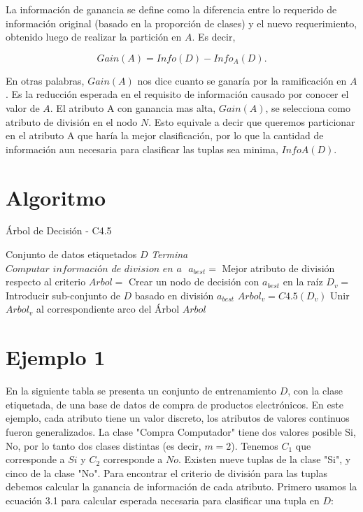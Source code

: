 La información de ganancia se define como la diferencia entre lo requerido de información original (basado en la proporción de clases) y el nuevo requerimiento, obtenido luego de realizar la partición en $A$. Es decir,

\begin{equation}
Gain(A) = Info(D) - Info_{A}(D).
\end{equation}

En otras palabras, $Gain(A)$ nos dice cuanto se ganaría por la ramificación en $A$. Es la reducción esperada en el requisito de información causado por conocer el valor de $A$. El atributo A con ganancia mas alta, $Gain(A)$, se selecciona como atributo de división en el nodo $N$. Esto equivale a decir que queremos particionar en el atributo A que haría la mejor clasificación, por lo que la cantidad de información aun necesaria para clasificar las tuplas sea minima, $InfoA(D)$.


\section{Algoritmo}

\begin{algorithm}
	\caption{Árbol de Decisión - C4.5}
	\label{algoC45}
	\begin{algorithmic}[1]
		\Require Conjunto de datos etiquetados $D$
				\State\textit{Termina}
			\EndIf
				\State $\textit{Computar información de division en a }$
			\EndFor
			\State $ a_{best} =$ Mejor atributo de división respecto al criterio 
			\State $ Arbol =$ Crear un nodo de decisión con $ a_{best} $ en la raíz 
			\State $ D_{v} =$ Introducir sub-conjunto de $D$ basado en división $ a_{best} $
				\State $ Arbol_{v} = C4.5(D_{v}) $
				\State Unir $ Arbol_{v} $ al correspondiente arco del Árbol
			\EndFor
			\State 
			\Return $ Arbol $
		\EndProcedure
	\end{algorithmic}
\end{algorithm}

\section{Ejemplo 1}

En la siguiente tabla se presenta un conjunto de entrenamiento $D$, con la clase etiquetada, de una base de datos de compra de productos electrónicos. En este ejemplo, cada atributo tiene un valor discreto, los atributos de valores continuos fueron generalizados. La clase "Compra Computador" tiene dos valores posible {Si, No}, por lo tanto dos clases distintas (es decir, $m=2$). Tenemos $C_1$ que corresponde a $Si$ y $C_2$ corresponde a $No$.
Existen nueve tuplas de la clase "Si", y cinco de la clase "No". Para encontrar el criterio de división para las tuplas debemos calcular la ganancia de información de cada atributo. Primero usamos la ecuación 3.1 para calcular esperada necesaria para clasificar una tupla en $D$:

